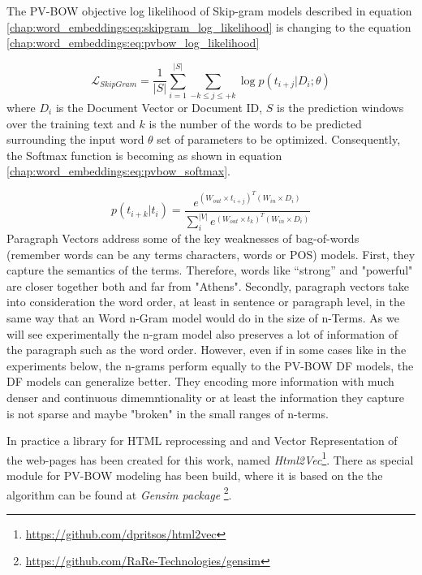 The PV-BOW objective log likelihood of Skip-gram models described in equation \ref{chap:word_embeddings:eq:skipgram_log_likelihood} is changing to the equation \ref{chap:word_embeddings:eq:pvbow_log_likelihood}  

\begin{equation} \label{chap:word_embeddings:eq:pvbow_log_likelihood}
	 \mathcal{L}_{SkipGram} = \frac{1}{|S|} \sum_{i=1}^{|S|}{ \sum_{-k \leq j \leq +k}{ \log {p(t_{i+j}|D_{i};\theta)}  } }
\end{equation}
\noindent
where $D_{i}$ is the Document Vector or Document ID, $S$ is the prediction windows over the training text and $k$ is the number of the words to be predicted surrounding the input word $\theta$ set of parameters to be optimized. Consequently,  the Softmax function is becoming as shown in equation \ref{chap:word_embeddings:eq:pvbow_softmax}.

\begin{equation} \label{chap:word_embeddings:eq:pvbow_softmax}
	p(t_{i+k}|t_{i}) = \frac{ e^{(W_{out}  \times  t_{i+j})^{T} (W_{in} \times  D_{i})}}{\sum^{|V|}_{i}{ e^{(W_{out}  \times  t_{k})^{T} (W_{in} \times  D_{i})}}} 
\end{equation}
Paragraph Vectors address some of the key weaknesses of bag-of-words (remember words can be any terms characters, words or POS) models. First, they capture the semantics of the terms. Therefore, words like “strong”  and "powerful" are closer together both and far from "Athens". Secondly, paragraph vectors take into consideration the word order, at least in sentence or paragraph level, in the same way that an Word n-Gram model would do in the size of n-Terms. As we will see experimentally the n-gram model also preserves a lot of information of the paragraph such as the word order. However, even if in some cases like in the experiments below, the n-grams perform equally to the PV-BOW DF models, the DF models can generalize better. They encoding more information with much denser and continuous dimemntionality or at least the information they capture is not sparse and maybe "broken" in the small ranges of n-terms.

In practice a library for HTML reprocessing and and Vector Representation of the web-pages has been created for this work, named  \textit{Html2Vec}\footnote{\url{https://github.com/dpritsos/html2vec}}. There as special module for PV-BOW modeling has been build, where it is based on the the algorithm can be found at \textit{Gensim package} \footnote{\url{https://github.com/RaRe-Technologies/gensim}}. 

